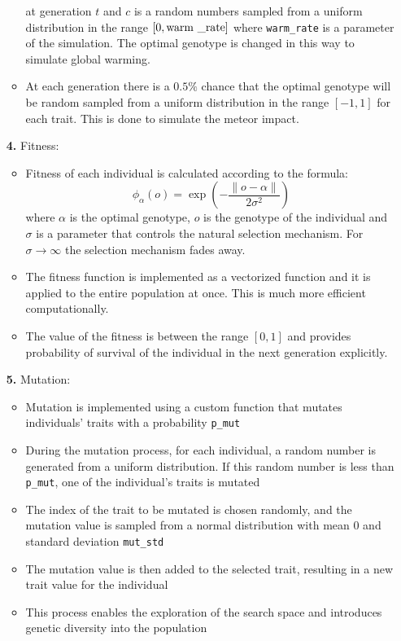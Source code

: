 \documentclass{article}
\begin{document}
\begin{itemize}
\begin{itemize}
            at generation $t$ and $c$ is a random numbers sampled from a uniform distribution in the range
            $[0, \text{warm \textunderscore rate}]$ where \verb|warm_rate| is a parameter of the simulation. The optimal 
            genotype is changed in this way to simulate global warming.
            \item At each generation there is a $0.5\%$ chance that the optimal genotype will be random 
            sampled from a uniform distribution in the range $[-1, 1]$ for each trait. This is done to
            simulate the meteor impact.
        \end{itemize}
    \item[\textbf{4.}] Fitness:
        \begin{itemize}
            \item Fitness of each individual is calculated according to the formula:
            $$
            \phi_{\alpha}(o)=\exp \left(-\frac{\|o-\alpha\|}{2 \sigma^{2}}\right)
            $$
            where $\alpha$ is the optimal genotype, $o$ is the genotype of the individual and $\sigma$ is
            a parameter that controls the natural selection mechanism. For $\sigma \rightarrow \infty$ the
            selection mechanism fades away.
            \item The fitness function is implemented as a vectorized function and it is applied to the 
            entire population at once. This is much more efficient computationally.
            \item The value of the fitness is between the range $[0, 1]$ and provides probability of 
            survival of the individual in the next generation explicitly.
        \end{itemize}
    \item[\textbf{5.}] Mutation:
        \begin{itemize}
            \item Mutation is implemented using a custom function that mutates individuals' traits with a probability \verb|p_mut|
            \item During the mutation process, for each individual, a random number is generated from a uniform distribution. If this random number is less than \verb|p_mut|, one of the individual's traits is mutated
            \item The index of the trait to be mutated is chosen randomly, and the mutation value is sampled from a normal distribution with mean 0 and standard deviation \verb|mut_std|
            \item The mutation value is then added to the selected trait, resulting in a new trait value for the individual
            \item This process enables the exploration of the search space and introduces genetic diversity into the population
        \end{itemize}


\end{itemize}
\end{document}
